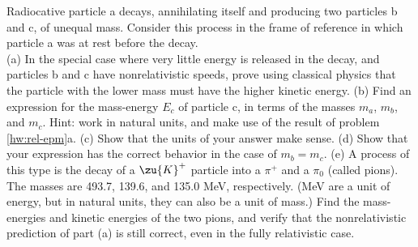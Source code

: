Radiocative particle a decays, annihilating itself and producing two particles b and c, of unequal mass.
Consider this process in the frame of reference in which particle a was at rest before the decay.\\
(a) In the special case where very little energy is released in the decay, and particles b and c have
nonrelativistic speeds, prove using classical physics that the particle with the lower mass must have
the higher kinetic energy.\hwendpart
(b) Find an expression for the mass-energy $E_c$ of particle c, in terms of the masses $m_a$, $m_b$, and $m_c$.
Hint: work in natural units, and make use of the result of problem \ref{hw:rel-epm}a.\answercheck\hwendpart
(c) Show that the units of your answer make sense.\hwendpart
(d) Show that your expression has the correct behavior in the case of $m_b=m_c$.\hwendpart
(e) A process of this type is the decay of a $\zu{K}^+$ particle into a $\pi^+$ and a $\pi_0$ (called pions).
The masses are 493.7, 139.6, and 135.0 MeV, respectively. (MeV are a unit of energy, but in natural units, they
can also be a unit of mass.) Find the mass-energies and kinetic energies of the two pions, and verify that
the nonrelativistic prediction of part (a) is still correct, even in the fully relativistic case.
